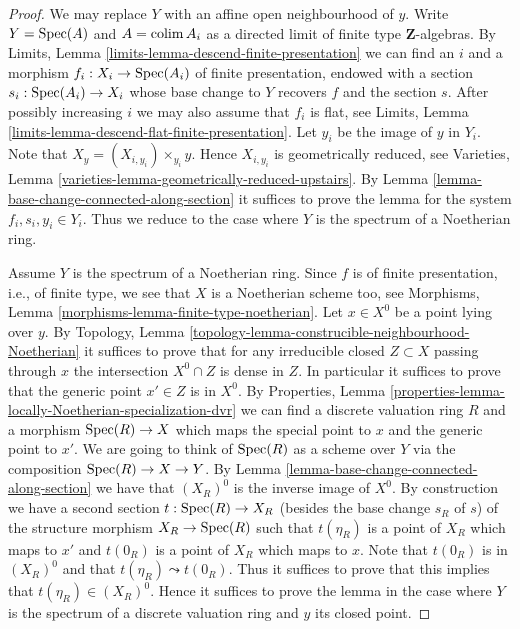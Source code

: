 \begin{proof}
We may replace $Y$ with an affine open neighbourhood of $y$.
Write $Y = \mathop{\rm Spec}(A)$ and $A = \mathop{\rm colim}\nolimits A_i$ as a directed
limit of finite type $\mathbf{Z}$-algebras. By
Limits, Lemma \ref{limits-lemma-descend-finite-presentation}
we can find an $i$ and a morphism $f_i : X_i \to \mathop{\rm Spec}(A_i)$ of
finite presentation, endowed with a section $s_i : \mathop{\rm Spec}(A_i) \to X_i$
whose base change to $Y$ recovers $f$ and the section $s$.
After possibly increasing $i$ we may also assume that $f_i$ is flat, see
Limits, Lemma \ref{limits-lemma-descend-flat-finite-presentation}.
Let $y_i$ be the image of $y$ in $Y_i$. Note that
$X_y = (X_{i, y_i}) \times_{y_i} y$. Hence $X_{i, y_i}$ is geometrically
reduced, see
Varieties, Lemma \ref{varieties-lemma-geometrically-reduced-upstairs}.
By
Lemma \ref{lemma-base-change-connected-along-section}
it suffices to prove the lemma for the system $f_i, s_i, y_i \in Y_i$.
Thus we reduce to the case where $Y$ is the spectrum of a Noetherian ring.

\medskip\noindent
Assume $Y$ is the spectrum of a Noetherian ring.
Since $f$ is of finite presentation,
i.e., of finite type, we see that $X$ is a Noetherian scheme too, see
Morphisms, Lemma \ref{morphisms-lemma-finite-type-noetherian}.
Let $x \in X^0$ be a point lying over $y$. By
Topology, Lemma \ref{topology-lemma-construcible-neighbourhood-Noetherian}
it suffices to prove that for any irreducible closed $Z \subset X$
passing through $x$ the intersection $X^0 \cap Z$ is dense in $Z$.
In particular it suffices to prove that the generic point $x' \in Z$
is in $X^0$. By
Properties, Lemma \ref{properties-lemma-locally-Noetherian-specialization-dvr}
we can find a discrete valuation ring $R$ and a morphism
$\mathop{\rm Spec}(R) \to X$ which maps the special point to $x$ and
the generic point to $x'$. We are going to think of $\mathop{\rm Spec}(R)$
as a scheme over $Y$ via the composition $\mathop{\rm Spec}(R) \to X \to Y$. By
Lemma \ref{lemma-base-change-connected-along-section}
we have that $(X_R)^0$ is the inverse image of $X^0$.
By construction we have a second section $t : \mathop{\rm Spec}(R) \to X_R$
(besides the base change $s_R$ of $s$)
of the structure morphism $X_R \to \mathop{\rm Spec}(R)$ such that
$t(\eta_R)$ is a point of $X_R$ which maps to $x'$ and
$t(0_R)$ is a point of $X_R$ which maps to $x$. Note that
$t(0_R)$ is in $(X_R)^0$ and that $t(\eta_R) \leadsto t(0_R)$.
Thus it suffices to prove that this implies that $t(\eta_R) \in (X_R)^0$.
Hence it suffices to prove the lemma in the case where $Y$
is the spectrum of a discrete valuation ring and $y$ its closed point.


\end{proof}

